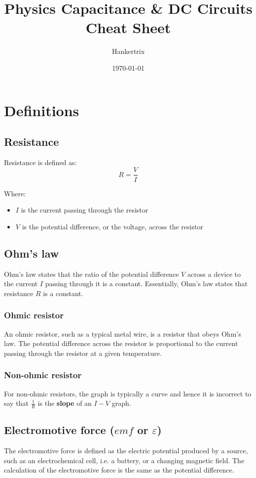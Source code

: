 \documentclass[11pt]{article}
\author{Hankertrix}
\date{\today}
\title{Physics Capacitance \& DC Circuits Cheat Sheet}
\begin{document}
\maketitle
\setcounter{tocdepth}{2}
\tableofcontents

\newpage

\section{Definitions}
\label{sec:org8ec3c2d}

\subsection{Resistance}
\label{sec:org8d38481}
Resistance is defined as:
\[R = \frac{V}{I}\]

Where:
\begin{itemize}
\item \(I\) is the current passing through the resistor
\item \(V\) is the potential difference, or the voltage, across the resistor
\end{itemize}

\subsection{Ohm's law}
\label{sec:orged3751e}
Ohm's law states that the ratio of the potential difference \(V\) across a device to the current \(I\) passing through it is a constant. Essentially, Ohm's law states that resistance \(R\) is a constant.

\subsubsection{Ohmic resistor}
\label{sec:org275549a}
An ohmic resistor, such as a typical metal wire, is a resistor that obeys Ohm's law. The potential difference across the resistor is proportional to the current passing through the resistor at a given temperature.

\subsubsection{Non-ohmic resistor}
\label{sec:orgb82f3bb}
For non-ohmic resistors, the graph is typically a curve and hence it is incorrect to say that \(\frac{1}{R}\) is the \textbf{slope} of an \(I-V\) graph.

\subsection{Electromotive force (\(emf\) or \(\varepsilon\))}
\label{sec:org34e0e60}
The electromotive force is defined as the electric potential produced by a source, such as an electrochemical cell, i.e. a battery, or a changing magnetic field. The calculation of the electromotive force is the same as the potential difference.
\\[0pt]
\end{document}
